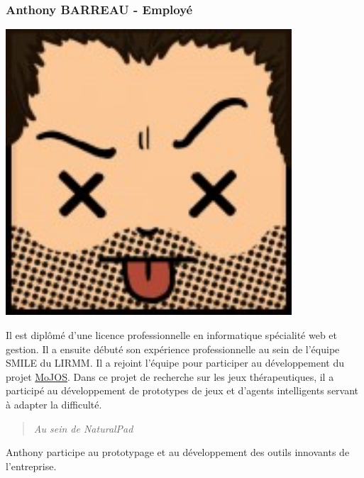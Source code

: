 		\subsubsection*{Anthony BARREAU - Employé}
\begin{minipage}[t!]{0.2\linewidth}
\centering
\includegraphics[width=0.8\textwidth]{images/tetocarre/anthony}
\end{minipage}
\begin{minipage}[t!]{0.79\linewidth}
Il est diplômé d’une licence professionnelle en informatique spécialité web et gestion. Il a ensuite débuté son expérience professionnelle au sein de l’équipe SMILE du LIRMM. Il a rejoint l’équipe pour participer au développement du projet \href{http://www.mojos.fr}{MoJOS}. Dans ce projet de recherche sur les jeux thérapeutiques, il a participé au développement de prototypes de jeux et d’agents intelligents servant à adapter la difficulté. 
		\begin{quotation} \emph{Au sein de NaturalPad} \end{quotation}
Anthony participe au prototypage et au développement des outils innovants de l’entreprise.
\end{minipage}

